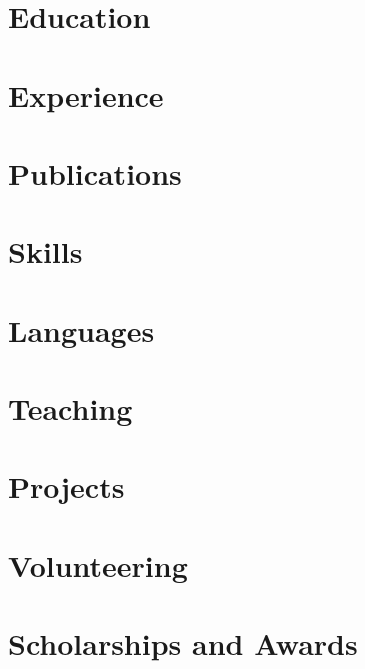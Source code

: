 \documentclass[letterpaper,11pt]{article}
\begin{document}


\section{Education}


\section{Experience}


\section{Publications}


\begin{minipage}[t]{0.495\textwidth}
\section{Skills}

\end{minipage}
\begin{minipage}[t]{0.495\textwidth}
\section{Languages}

\end{minipage}

\pagebreak

\section{Teaching}


\section{Projects}


\section{Volunteering}


\section{Scholarships and Awards}

\end{document}
